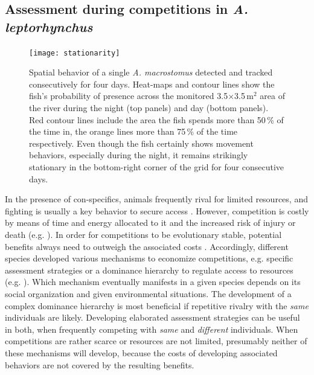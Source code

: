 \documentclass[11pt,pdftex]{article}
\newcommand{\lepto}{\textit{A. leptorhynchus}}
\newcommand{\macros}{\textit{A. macrostomus}}
\begin{document}
\subsection{Assessment during competitions in \lepto{}}

\begin{figure}[h!]
  \centerline{\texttt{[image: stationarity]}}
  \caption{\label{Colombia_stationarity} Spatial behavior of a single \macros{} detected and tracked consecutively for four days. Heat-maps and contour lines show the fish's probability of presence across the monitored 3.5$\times$3.5\,m$^2$ area of the river during the night (top panels) and day (bottom panels). Red contour lines include the area the fish spends more than 50\,\% of the time in, the orange lines more than 75\,\% of the time respectively. Even though the fish certainly shows movement behaviors, especially during the night, it remains strikingly stationary in the bottom-right corner of the grid for four consecutive days.}
\end{figure}

In the presence of con-specifics, animals frequently rival for limited resources, and fighting is usually a key behavior to secure access \citep{Cluttonbrock1979, Chapman1995, Markham2015}. However, competition is costly by means of time and energy allocated to it and the increased risk of injury or death (e.g. \citealp{Briffa2004}). In order for competitions to be evolutionary stable, potential benefits always need to outweigh the associated costs \citep{ArnottElwood2009}. Accordingly, different species developed various mechanisms to economize competitions, e.g. specific assessment strategies \citep{EnquistLeimar1987, Payne1998, Taylor2003} or a dominance hierarchy to regulate access to resources (e.g. \citealp{Janson1985, Sapolsky2005}). Which mechanism eventually manifests in a given species depends on its social organization and given environmental situations. The development of a complex dominance hierarchy is most beneficial if repetitive rivalry with the \emph{same} individuals are likely. Developing elaborated assessment strategies can be useful in both, when frequently competing with \emph{same} and \emph{different} individuals. When competitions are rather scarce or resources are not limited, presumably neither of these mechanisms will develop, because the costs of developing associated behaviors are not covered by the resulting benefits.
\end{document}

